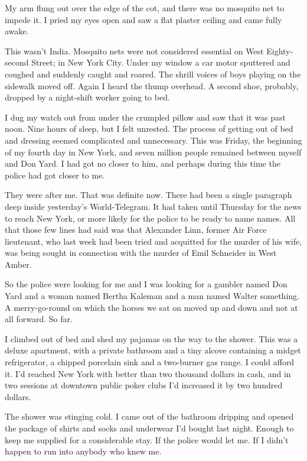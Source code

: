 \documentclass{novel}
\begin{document}
My arm flung out over the edge of the cot, and there was no mosquito net to impede it. I pried my eyes open and saw a flat plaster ceiling and came fully awake.

This wasn’t India. Mosquito nets were not considered essential on West Eighty-second Street; in New York City. Under my window a car motor sputtered and coughed and suddenly caught and roared. The shrill voices of boys playing on the sidewalk moved off. Again I heard the thump overhead. A second shoe, probably, dropped by a night-shift worker going to bed.

I dug my watch out from under the crumpled pillow and saw that it was past noon. Nine hours of sleep, but I felt unrested. The process of getting out of bed and dressing seemed complicated and unnecessary. This was Friday, the beginning of my fourth day in New York, and seven million people remained between myself and Don Yard. I had got no closer to him, and perhaps during this time the police had got closer to me.

They were after me. That was definite now. There had been a single paragraph deep inside yesterday’s World-Telegram. It had taken until Thursday for the news to reach New York, or more likely for the police to be ready to name names. All that those few lines had said was that Alexander Linn, former Air Force lieutenant, who last week had been tried and acquitted for the murder of his wife, was being sought in connection with the murder of Emil Schneider in West Amber.

So the police were looking for me and I was looking for a gambler named Don Yard and a woman named Bertha Kaleman and a man named Walter something. A merry-go-round on which the horses we sat on moved up and down and not at all forward. So far.

\scenestars

I climbed out of bed and shed my pajamas on the way to the shower. This was a deluxe apartment, with a private bathroom and a tiny alcove containing a midget refrigerator, a chipped porcelain sink and a two-burner gas range. I could afford it. I’d reached New York with better than two thousand dollars in cash, and in two sessions at downtown public poker clubs I’d increased it by two hundred dollars.

The shower was stinging cold. I came out of the bathroom dripping and opened the package of shirts and socks and underwear I’d bought last night. Enough to keep me supplied for a considerable stay. If the police would let me. If I didn’t happen to run into anybody who knew me.
\end{document}
